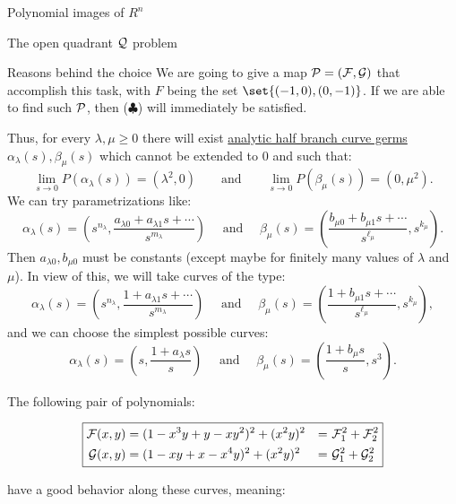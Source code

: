 \documentclass[11pt, a4paper, english, twoside, notitlepage]{report}
\begin{document}
\begin{chapter}{Polynomial images of $R^n$}
\begin{section}{The open quadrant $\Qu$ problem}
\begin{subsection}{Reasons behind the choice}
		We are going to give a map $\P = (\F , \G)$ that accomplish this task, with $F$ being the set $\set{(-1, 0), (0, -1)}$. If we are able to find such $\P$, then ($\clubsuit$) will immediately be satisfied. 
		
		Thus, for every $\lambda, \mu \ge 0$ there will exist \hyperref[curveGerms]{analytic half branch curve germs} $\alpha_{\lambda}(s),\beta_{\mu}(s)$ which cannot be extended to $0$ and such that:
		$$
		\lim_{s\rightarrow 0} P(\alpha_{\lambda}(s))=(\lambda^2,0)\qquad \text{and} \qquad
		\lim_{s\rightarrow 0} P(\beta_{\mu}(s))=(0,\mu^2).
		$$
		We can try parametrizations like:
		$$
		\alpha_{\lambda}(s)=\left(s^{n_{\lambda}},\frac{a_{\lambda 0}+a_{\lambda 1}s+\cdots}{s^{m_{\lambda}}}\right)
		\quad \text{ and } \quad
		\beta_{\mu}(s)=\left(\frac{b_{\mu 0}+b_{\mu 1}s+\cdots}{s^{\ell_{\mu}}},s^{k_{\mu}}\right).
		$$
		Then $a_{\lambda 0},b_{\mu 0}$ must be constants (except maybe for finitely many values of $\lambda$ and $\mu$). In view of this, we will take curves of the type:
		$$
		\alpha_{\lambda}(s)=\left(s^{n_{\lambda}},\frac{1+a_{\lambda 1}s+\cdots}{s^{m_{\lambda}}}\right)
		\quad \text{ and } \quad
		\beta_{\mu}(s)=\left(\frac{1+b_{\mu 1}s+\cdots}{s^{\ell_{\mu}}},s^{k_{\mu}}\right),
		$$
		and we can choose the simplest possible curves:
		$$
		\alpha_{\lambda}(s)=\left(s,\frac{1+a_{\lambda }s}{s}\right)
		\quad \text{ and } \quad
		\beta_{\mu}(s)=\left(\frac{1+b_{\mu }s}{s},s^{3}\right).
		$$
		
		The following pair of polynomials:
		
		\begin{equation*}
			\boxed{
				\begin{aligned}
					\F(x, y) & = (1 - x^3 y + y - x y^2)^2 + (x^2 y)^2 & = &\  \F_1^2 + \F_2^2 \\
					\G(x, y) & = (1 - xy + x - x^4 y)^2 + (x^2 y)^2 & = &\ \G_1^2 + \G_2^2\\
				\end{aligned}
			}
		\end{equation*}
		
		have a good behavior along these curves, meaning:
		

\end{subsection}
\end{section}
\end{chapter}
\end{document}
